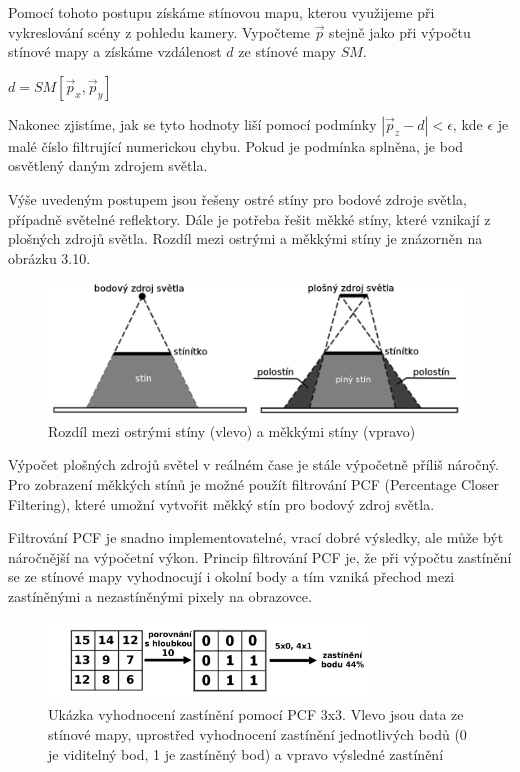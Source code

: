 \documentclass[11pt,twoside,a4paper]{book}
\begin{document}
Pomocí tohoto postupu získáme stínovou mapu, kterou využijeme při vykreslování scény z pohledu kamery. Vypočteme $\vec{p}$ stejně jako při výpočtu stínové mapy a získáme vzdálenost $d$ ze stínové mapy $SM$.
\begin{center}
$d = SM[\vec{p}_x, \vec{p}_y]$
\end{center}

Nakonec zjistíme, jak se tyto hodnoty liší pomocí podmínky $|\vec{p}_z - d| < \epsilon$, kde $\epsilon$ je malé číslo filtrující numerickou chybu. Pokud je podmínka splněna, je bod osvětlený daným zdrojem světla.
\bigskip

Výše uvedeným postupem jsou řešeny ostré stíny pro bodové zdroje světla, případně světelné reflektory. Dále je potřeba řešit měkké stíny, které vznikají z plošných zdrojů světla. Rozdíl mezi ostrými a měkkými stíny je znázorněn na obrázku 3.10.
\newpage

\begin{center}
\begin{figure}[h]
\includegraphics[width=110mm]{figures/shadows-pa.png}
\caption{Rozdíl mezi ostrými stíny (vlevo) a měkkými stíny (vpravo)}
\end{figure}
\end{center}

Výpočet plošných zdrojů světel v reálném čase je stále výpočetně příliš náročný. Pro zobrazení měkkých stínů je možné použít filtrování PCF (Percentage Closer Filtering), které umožní vytvořit měkký stín pro bodový zdroj světla.

Filtrování PCF je snadno implementovatelné, vrací dobré výsledky, ale může být náročnější na výpočetní výkon. Princip filtrování PCF je, že při výpočtu zastínění se ze stínové mapy vyhodnocují i okolní body a tím vzniká přechod mezi zastíněnými a nezastíněnými pixely na obrazovce.

\begin{center}
\begin{figure}[h]
\includegraphics[width=85mm]{figures/pcf.png}
\caption{Ukázka vyhodnocení zastínění pomocí PCF 3x3. Vlevo jsou data ze stínové mapy, uprostřed vyhodnocení zastínění jednotlivých bodů (0 je viditelný bod, 1 je zastíněný bod) a vpravo výsledné zastínění}
\end{figure}
\end{center}
\end{document}
